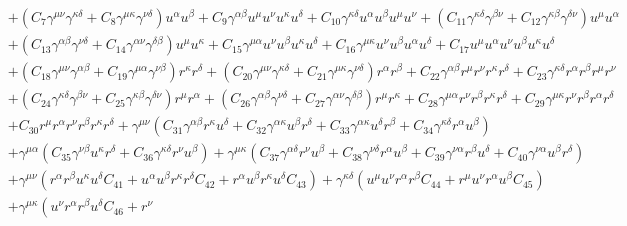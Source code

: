 \documentclass[10pt,twocolumn,preprintnumbers,amsmath,amssymb,nofootinbib
,superscriptaddress]{revtex4-1}
\begin{document}
\begin{widetext}
\begin{align}
 &+ \left(C_7 \gamma^{\mu\nu}\gamma^{\kappa\delta}+ C_8\gamma^{\mu\kappa}\gamma^{\nu\delta}\right)u^\alpha u^\beta + C_{9}\gamma^{\alpha\beta} u^\mu u^\nu u^\kappa u^\delta+C_{10}\gamma^{\kappa\delta} u^\alpha u^\beta u^\mu u^\nu
+ \left(C_{11}\gamma^{\kappa\delta}\gamma^{\beta \nu}+ C_{12}\gamma^{\kappa\beta}\gamma^{\delta \nu}\right)u^\mu u^\alpha\nonumber\\
&+ \left(C_{13}\gamma^{\alpha\beta}\gamma^{\nu \delta}+ C_{14}\gamma^{\alpha\nu}\gamma^{\delta \beta}\right)u^\mu u^\kappa
+C_{15}\gamma^{\mu\alpha}u^\nu u^\beta u^\kappa u^\delta + C_{16}\gamma^{\mu\kappa}u^\nu u^\beta u^\alpha u^\delta+ C_{17} u^\mu u^\alpha u^\nu u^\beta u^\kappa u^\delta\nonumber\\
&+\left(C_{18} \gamma^{\mu\nu}\gamma^{\alpha\beta}+ C_{19}\gamma^{\mu\alpha}\gamma^{\nu\beta}\right)r^\kappa r^\delta + \left(C_{20} \gamma^{\mu\nu}\gamma^{\kappa\delta}+ C_{21}\gamma^{\mu\kappa}\gamma^{\nu\delta}\right)r^\alpha r^\beta + C_{22}\gamma^{\alpha\beta} r^\mu r^\nu r^\kappa r^\delta+C_{23}\gamma^{\kappa\delta} r^\alpha r^\beta r^\mu r^\nu
\nonumber\\
&+ \left(C_{24}\gamma^{\kappa\delta}\gamma^{\beta \nu}+ C_{25}\gamma^{\kappa\beta}\gamma^{\delta \nu}\right)r^\mu r^\alpha+ \left(C_{26}\gamma^{\alpha\beta}\gamma^{\nu \delta}+ C_{27}\gamma^{\alpha\nu}\gamma^{\delta \beta}\right)r^\mu r^\kappa
+C_{28}\gamma^{\mu\alpha}r^\nu r^\beta r^\kappa r^\delta + C_{29}\gamma^{\mu\kappa}r^\nu r^\beta r^\alpha r^\delta\nonumber\\
&+ C_{30} r^\mu r^\alpha r^\nu r^\beta r^\kappa r^\delta+\gamma^{\mu\nu}\left(C_{31}\gamma^{\alpha\beta}r^\kappa u^\delta +C_{32}\gamma^{\alpha\kappa}u^\beta r^\delta+C_{33}\gamma^{\alpha\kappa}u^\delta r^\beta+C_{34}\gamma^{\kappa\delta}r^\alpha u^\beta\right)\nonumber\\
&+\gamma^{\mu\alpha}\left(C_{35}\gamma^{\nu\beta}u^\kappa r^\delta +C_{36}\gamma^{\kappa\delta}r^\nu u^\beta\right)+\gamma^{\mu\kappa}\left(C_{37}\gamma^{\alpha\delta}r^\nu u^\beta+C_{38}\gamma^{\nu\delta}r^\alpha u^\beta +C_{39}\gamma^{\nu\alpha}r^\beta u^\delta +C_{40}\gamma^{\nu\alpha}u^\beta r^\delta\right)\nonumber\\
&+\gamma^{\mu\nu} \left(r^\alpha r^\beta u^\kappa u^\delta C_{41}+u^\alpha u^\beta r^\kappa r^\delta C_{42}+r^\alpha u^\beta
 r^\kappa u^\delta C_{43}\right)+\gamma^{\kappa\delta} \left(u^\mu u^\nu r^\alpha r^\beta C_{44}+r^\mu u^\nu
 r^\alpha u^\beta C_{45}\right)\nonumber\\
 &+\gamma^{\mu\kappa} \left(u^\nu
 r^\alpha r^\beta u^\delta C_{46}+r^\nu

\end{align}
\end{widetext}
\end{document}
